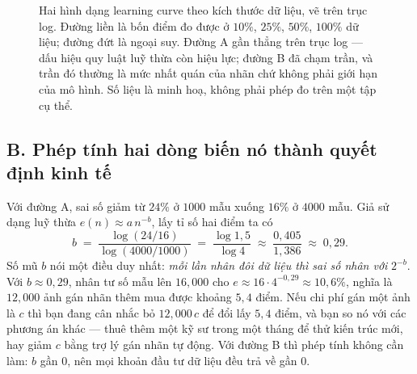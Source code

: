 \documentclass[../../deep_learning.tex]{subfiles}
\begin{document}
\begin{figure}[H]\centering
{}
\caption{Hai hình dạng learning curve theo kích thước dữ liệu, vẽ trên trục log. Đường liền là bốn điểm đo được ở \(10\%\), \(25\%\), \(50\%\), \(100\%\) dữ liệu; đường đứt là ngoại suy. Đường A gần thẳng trên trục log --- dấu hiệu quy luật luỹ thừa còn hiệu lực; đường B đã chạm trần, và trần đó thường là mức nhất quán của nhãn chứ không phải giới hạn của mô hình. Số liệu là minh hoạ, không phải phép đo trên một tập cụ thể.}
\label{fig:learning-curve}
\end{figure}

\subsection{B. Phép tính hai dòng biến nó thành quyết định kinh tế}
Với đường A, sai số giảm từ \(24\%\) ở \(1000\) mẫu xuống \(16\%\) ở \(4000\) mẫu. Giả sử dạng luỹ thừa \(e(n) \approx a\,n^{-b}\), lấy tỉ số hai điểm ta có
\[
b \;=\; \frac{\log(24/16)}{\log(4000/1000)} \;=\; \frac{\log 1{,}5}{\log 4} \;\approx\; \frac{0{,}405}{1{,}386} \;\approx\; 0{,}29 .
\]
Số mũ \(b\) nói một điều duy nhất: \emph{mỗi lần nhân đôi dữ liệu thì sai số nhân với} \(2^{-b}\). Với \(b \approx 0{,}29\), nhân tư số mẫu lên \(16{,}000\) cho \(e \approx 16 \cdot 4^{-0{,}29} \approx 10{,}6\%\), nghĩa là \(12{,}000\) ảnh gán nhãn thêm mua được khoảng \(5{,}4\) điểm. Nếu chi phí gán một ảnh là \(c\) thì bạn đang cân nhắc bỏ \(12{,}000\,c\) để đổi lấy \(5{,}4\) điểm, và bạn so nó với các phương án khác --- thuê thêm một kỹ sư trong một tháng để thử kiến trúc mới, hay giảm \(c\) bằng trợ lý gán nhãn tự động. Với đường B thì phép tính không cần làm: \(b\) gần \(0\), nên mọi khoản đầu tư dữ liệu đều trả về gần \(0\).
\end{document}
